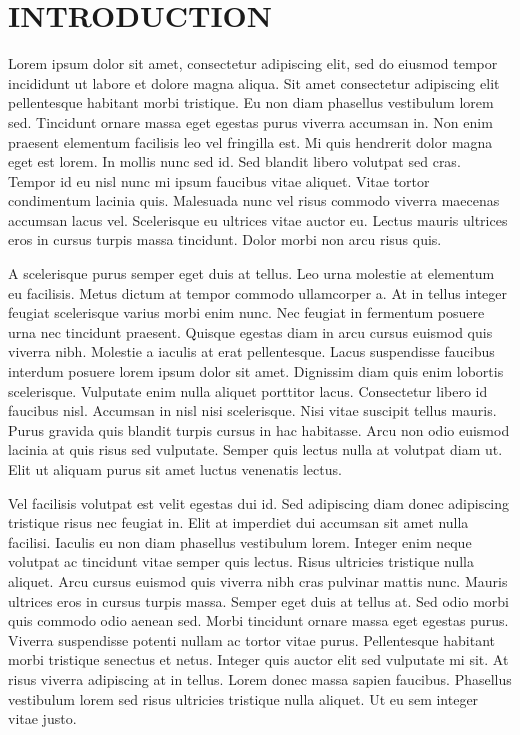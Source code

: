 \documentclass[journal=jctc, manuscript=article]{achemso}
\begin{document}
\section{INTRODUCTION}
Lorem ipsum dolor sit amet, consectetur adipiscing elit, sed do eiusmod tempor incididunt ut labore et dolore magna aliqua. Sit amet consectetur adipiscing elit pellentesque habitant morbi tristique. Eu non diam phasellus vestibulum lorem sed. Tincidunt ornare massa eget egestas purus viverra accumsan in. Non enim praesent elementum facilisis leo vel fringilla est. Mi quis hendrerit dolor magna eget est lorem. In mollis nunc sed id. Sed blandit libero volutpat sed cras. Tempor id eu nisl nunc mi ipsum faucibus vitae aliquet. Vitae tortor condimentum lacinia quis. Malesuada nunc vel risus commodo viverra maecenas accumsan lacus vel. Scelerisque eu ultrices vitae auctor eu. Lectus mauris ultrices eros in cursus turpis massa tincidunt. Dolor morbi non arcu risus quis.

A scelerisque purus semper eget duis at tellus. Leo urna molestie at elementum eu facilisis. Metus dictum at tempor commodo ullamcorper a. At in tellus integer feugiat scelerisque varius morbi enim nunc. Nec feugiat in fermentum posuere urna nec tincidunt praesent. Quisque egestas diam in arcu cursus euismod quis viverra nibh. Molestie a iaculis at erat pellentesque. Lacus suspendisse faucibus interdum posuere lorem ipsum dolor sit amet. Dignissim diam quis enim lobortis scelerisque. Vulputate enim nulla aliquet porttitor lacus. Consectetur libero id faucibus nisl. Accumsan in nisl nisi scelerisque. Nisi vitae suscipit tellus mauris. Purus gravida quis blandit turpis cursus in hac habitasse. Arcu non odio euismod lacinia at quis risus sed vulputate. Semper quis lectus nulla at volutpat diam ut. Elit ut aliquam purus sit amet luctus venenatis lectus.

Vel facilisis volutpat est velit egestas dui id. Sed adipiscing diam donec adipiscing tristique risus nec feugiat in. Elit at imperdiet dui accumsan sit amet nulla facilisi. Iaculis eu non diam phasellus vestibulum lorem. Integer enim neque volutpat ac tincidunt vitae semper quis lectus. Risus ultricies tristique nulla aliquet. Arcu cursus euismod quis viverra nibh cras pulvinar mattis nunc. Mauris ultrices eros in cursus turpis massa. Semper eget duis at tellus at. Sed odio morbi quis commodo odio aenean sed. Morbi tincidunt ornare massa eget egestas purus. Viverra suspendisse potenti nullam ac tortor vitae purus. Pellentesque habitant morbi tristique senectus et netus. Integer quis auctor elit sed vulputate mi sit. At risus viverra adipiscing at in tellus. Lorem donec massa sapien faucibus. Phasellus vestibulum lorem sed risus ultricies tristique nulla aliquet. Ut eu sem integer vitae justo.
\end{document}
